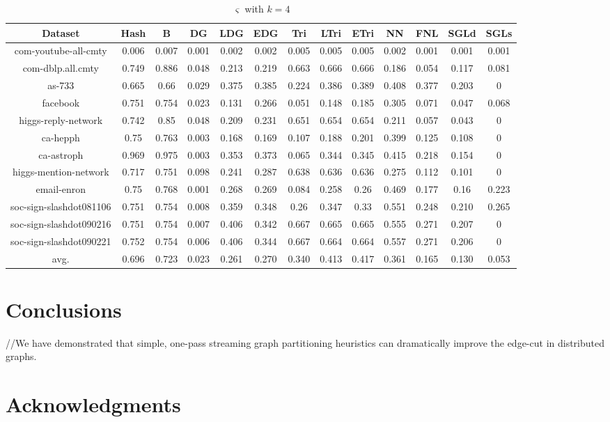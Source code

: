 \documentclass{sig-alternate-2013}
\begin{document}
\begin{table*}[!hpp]
\centering
\caption{$\varsigma$ with $k=4$}
\begin{tabular}{ccccccccccccc}
\hline
Dataset                 &Hash       &B          &DG         &LDG        &EDG        &Tri        &LTri       &ETri      &NN         &FNL        &SGLd   &SGLs\\
\hline
com-youtube-all-cmty	&0.006		&0.007		&0.001		&0.002		&0.002		&0.005		&0.005		&0.005		&0.002		&0.001		&0.001		&0.001\\
com-dblp.all.cmty		&0.749		&0.886		&0.048		&0.213		&0.219		&0.663		&0.666		&0.666		&0.186		&0.054		&0.117		&0.081\\
as-733		            &0.665		&0.66		&0.029		&0.375		&0.385		&0.224		&0.386		&0.389		&0.408		&0.377		&0.203		&0\\
facebook		        &0.751		&0.754		&0.023		&0.131		&0.266		&0.051		&0.148		&0.185		&0.305		&0.071		&0.047		&0.068\\
higgs-reply-network		&0.742		&0.85		&0.048		&0.209		&0.231		&0.651		&0.654		&0.654		&0.211		&0.057		&0.043		&0\\
ca-hepph		        &0.75		&0.763		&0.003		&0.168		&0.169		&0.107		&0.188		&0.201		&0.399		&0.125		&0.108		&0\\
ca-astroph		        &0.969		&0.975		&0.003		&0.353		&0.373		&0.065		&0.344		&0.345		&0.415		&0.218		&0.154		&0\\
higgs-mention-network	&0.717		&0.751		&0.098		&0.241		&0.287		&0.638		&0.636		&0.636		&0.275		&0.112		&0.101		&0\\
email-enron		        &0.75		&0.768		&0.001		&0.268		&0.269		&0.084		&0.258		&0.26		&0.469		&0.177		&0.16		&0.223\\
soc-sign-slashdot081106	&0.751		&0.754		&0.008		&0.359		&0.348		&0.26		&0.347		&0.33		&0.551		&0.248		&0.210		&0.265\\
soc-sign-slashdot090216	&0.751		&0.754		&0.007		&0.406		&0.342		&0.667		&0.665		&0.665		&0.555		&0.271		&0.207		&0\\
soc-sign-slashdot090221	&0.752		&0.754		&0.006		&0.406		&0.344		&0.667		&0.664		&0.664		&0.557		&0.271		&0.206		&0\\
\hline
avg.                    &0.696      &0.723      &0.023	    &0.261   	&0.270	    &0.340	    &0.413	    &0.417	    &0.361	    &0.165	    &0.130	    &0.053\\

\hline
\end{tabular}
\end{table*}

\section{Conclusions}
//We have demonstrated that simple, one-pass streaming graph partitioning heuristics can dramatically improve the edge-cut in distributed graphs.
\section{Acknowledgments}




\balancecolumns
\end{document}
